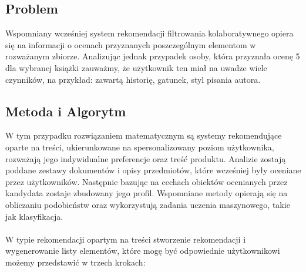 \documentclass[12pt,a4paper]{report}
\begin{document}
\subsection{Problem}
Wspomniany wcześniej system rekomendacji filtrowania kolaboratywnego opiera się na informacji o ocenach przyznanych poszczególnym elementom w rozważanym zbiorze. Analizując jednak przypadek osoby, która przyznała ocenę 5 dla wybranej książki zauważmy, że użytkownik ten miał na uwadze wiele czynników, na przykład: zawartą historię, gatunek, styl pisania autora. 
\\
\subsection{Metoda i Algorytm}
W tym przypadku rozwiązaniem matematycznym są systemy rekomendujące oparte na treści, ukierunkowane na spersonalizowany poziom użytkownika, rozważają jego indywidualne preferencje oraz treść produktu. Analizie zostają poddane zestawy dokumentów i opisy przedmiotów, które wcześniej były oceniane przez użytkowników. Następnie bazując na cechach obiektów ocenianych przez kandydata zostaje zbudowany jego profil. Wspomniane metody opierają się na obliczaniu podobieństw oraz wykorzystują zadania uczenia maszynowego, takie jak klasyfikacja.
\\
\\
W typie rekomendacji opartym na treści stworzenie rekomendacji i wygenerowanie listy elementów, które mogę być odpowiednie użytkownikowi możemy przedstawić w trzech krokach:
\end{document}

